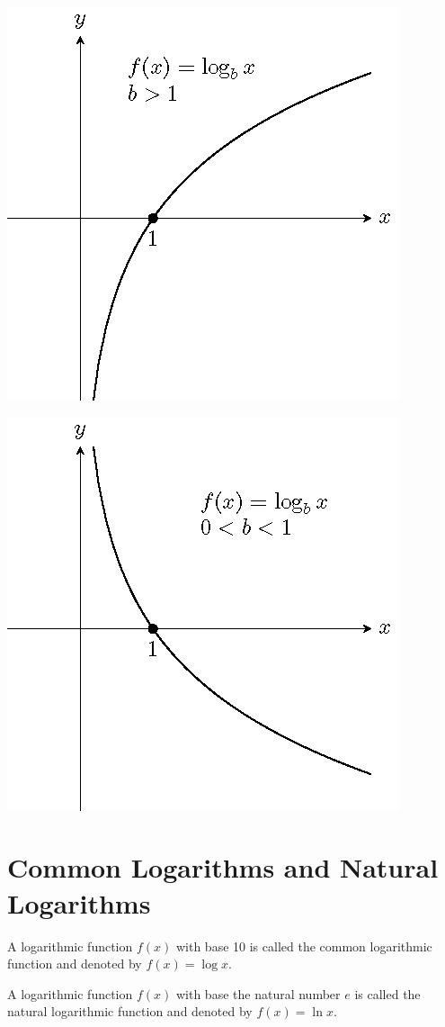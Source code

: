 \documentclass[en,11pt]{elegantbook}
\begin{document}
\begin{multicols}{2}

\begin{center}\includegraphics[width=0.5\linewidth]{figs/tikz-example-log-function-graph-1} \end{center}

\begin{center}\includegraphics[width=0.5\linewidth]{figs/tikz-example-log-function-graph-2} \end{center}

\end{multicols}

\hypertarget{common-logarithms-and-natural-logarithms}{%
\section{Common Logarithms and Natural Logarithms}\label{common-logarithms-and-natural-logarithms}}

A logarithmic function \(f(x)\) with base 10 is called the common logarithmic function and denoted by \(f(x)=\log x\).

A logarithmic function \(f(x)\) with base the natural number \(e\) is called the natural logarithmic function and denoted by \(f(x)=\ln x\).
\end{document}

